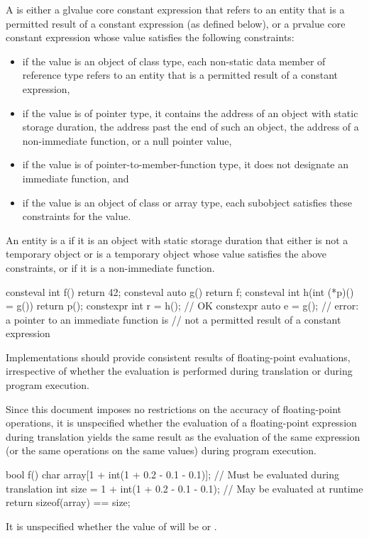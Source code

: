 \pnum
A  is either
a glvalue core constant expression that refers to
an entity that is a permitted result of a constant expression (as defined below), or
a prvalue core constant expression whose value
satisfies the following constraints:
\begin{itemize}
  \item
  if the value is an object of class type,
  each non-static data member of reference type refers to
  an entity that is a permitted result of a constant expression,
  \item
  if the value is of pointer type, it contains
  the address of an object with static storage duration,
  the address past the end of such an object,
  the address of a non-immediate function,
  or a null pointer value,

  \item
  if the value is of pointer-to-member-function type,
  it does not designate an immediate function, and

  \item
  if the value is an object of class or array type,
  each subobject satisfies these constraints for the value.
\end{itemize}
An entity is a
if it is an
object with static storage duration that either is not a temporary object or is
a temporary object whose value satisfies the above constraints, or if
it is a non-immediate function.
\begin{example}
\begin{codeblock}
consteval int f() { return 42; }
consteval auto g() { return f; }
consteval int h(int (*p)() = g()) { return p(); }
constexpr int r = h();                          // OK
constexpr auto e = g();                         // error: a pointer to an immediate function is
                                                // not a permitted result of a constant expression
\end{codeblock}
\end{example}

\pnum
\recommended
Implementations should provide consistent results of floating-point evaluations,
irrespective of whether the evaluation is performed
during translation or during program execution.
\begin{note}
Since this document
imposes no restrictions on the accuracy of floating-point operations, it is unspecified whether the
evaluation of a floating-point expression during translation yields the same result as the
evaluation of the same expression (or the same operations on the same values) during program
execution.
\begin{example}
\begin{codeblock}
bool f() {
    char array[1 + int(1 + 0.2 - 0.1 - 0.1)];   // Must be evaluated during translation
    int size = 1 + int(1 + 0.2 - 0.1 - 0.1);    // May be evaluated at runtime
    return sizeof(array) == size;
}
\end{codeblock}
It is unspecified whether the value of  will be  or .
\end{example}
\end{note}

